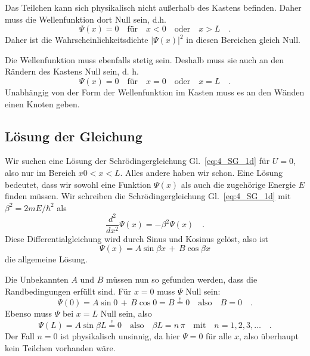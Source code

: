 Das Teilchen kann sich physikalisch nicht außerhalb des Kastens befinden. Daher muss die Wellenfunktion dort Null sein, d.h.
\begin{equation}
    \Psi(x) = 0 \quad \text{für} \quad x < 0  \quad \text{oder} \quad x > L \quad .
 \end{equation}
 Daher ist die Wahrscheinlichkeitsdichte $|\Psi(x)|^2$ in diesen Bereichen gleich Null.

Die Wellenfunktion muss ebenfalls stetig sein. Deshalb muss sie auch an den Rändern des Kastens Null sein, d. h.
\begin{equation}
    \Psi(x) = 0 \quad \text{für} \quad x = 0  \quad \text{oder} \quad x = L \quad .
 \end{equation}
 Unabhängig von der Form der Wellenfunktion im Kasten muss es an den Wänden einen Knoten geben.



\subsection{Lösung der Gleichung}

Wir suchen eine Lösung der Schrödingergleichung Gl.~\ref{eq:4_SG_1d} für $U=0$, also nur im Bereich $x0<x<L$. Alles andere haben wir schon. Eine Lösung bedeutet, dass wir sowohl eine Funktion $\Psi(x)$ als auch die zugehörige Energie $E$ finden müssen.
Wir schreiben die Schrödingergleichung Gl.~\ref{eq:4_SG_1d} mit $\beta^2 = 2 m E / \hbar^2$ als
\begin{equation}
    \frac{d^2}{dx^2} \Psi(x) = - \beta^2 \Psi(x)  \quad .
  \end{equation}
Diese Differentialgleichung wird durch Sinus und Kosinus gelöst, also ist 
\begin{equation}
    \Psi(x) = A \sin \beta x  \, + \, B \cos \beta x
\end{equation}
die allgemeine Lösung. 

Die Unbekannten $A$ und $B$ müssen nun so gefunden werden, dass die Randbedingungen erfüllt sind. Für $x=0$ muss $\Psi$ Null sein:
\begin{equation}
    \Psi(0) =  A \sin   0  \, + \, B \cos   0 = B \overset{!}{=} 0 \quad \text{also} \quad B = 0 \quad .
\end{equation}
Ebenso muss $\Psi$ bei $x=L$ Null sein, also 
\begin{equation}
    \Psi(L) = A \sin \beta L \overset{!}{=} 0 \quad \text{also} \quad \beta L = n \, \pi \quad \text{mit} \quad n = 1, 2, 3, \dots \quad .
\end{equation}
Der Fall $n=0$ ist physikalisch unsinnig, da hier $\Psi = 0$ für alle $x$, also überhaupt kein Teilchen vorhanden wäre.

